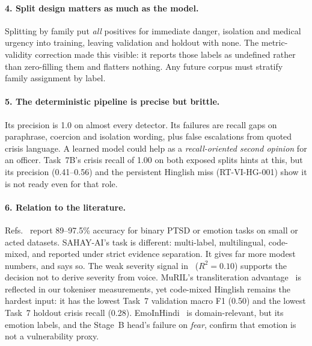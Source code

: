 \documentclass[11pt,a4paper]{article}
\newcommand{\codeus}{\textunderscore\allowbreak}
\DeclareRobustCommand{\code}[1]{{\ttfamily\let\_\codeus #1}}
\begin{document}
\paragraph{4. Split design matters as much as the model.}
Splitting by family put \emph{all} positives for immediate danger, isolation and medical urgency
into training, leaving validation and holdout with none. The metric-validity correction made this
visible: it reports those labels as undefined rather than zero-filling them and flatters nothing.
Any future corpus must stratify family assignment by label.

\paragraph{5. The deterministic pipeline is precise but brittle.}
Its precision is 1.0 on almost every detector. Its failures are recall gaps on paraphrase,
coercion and isolation wording, plus false escalations from quoted crisis language. A learned model
could help as a \emph{recall-oriented second opinion} for an officer. Task~7B's crisis recall of
1.00 on both exposed splits hints at this, but its precision (0.41--0.56) and the persistent
Hinglish miss (\code{RT-VI-HG-001}) show it is not ready even for that role.

\paragraph{6. Relation to the literature.}
Refs.~\cite{hu2024,islam2024} report 89--97.5\% accuracy for binary PTSD or emotion tasks on small or
acted datasets. SAHAY-AI's task is different: multi-label, multilingual, code-mixed, and reported
under strict evidence separation. It gives far more modest numbers, and says so. The weak severity
signal in~\cite{hu2024} ($R^2=0.10$) supports the decision not to derive severity from voice. MuRIL's
transliteration advantage~\cite{khanuja2021} is reflected in our tokeniser measurements, yet
code-mixed Hinglish remains the hardest input: it has the lowest Task~7 validation macro F1 (0.50)
and the lowest Task~7 holdout crisis recall (0.28). EmoInHindi~\cite{singh2022} is domain-relevant, but its
emotion labels, and the Stage~B head's failure on \emph{fear}, confirm that emotion is not a
vulnerability proxy.
\end{document}
